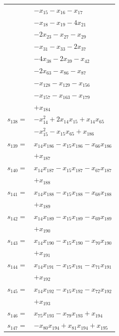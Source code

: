\begin{longtable}{@{}r@{\;}l@{}}
 & \(\displaystyle -x_{15} -x_{16} -x_{17}\) \\
 & \(\displaystyle -x_{18} -x_{19} -4x_{21}\) \\
 & \(\displaystyle -2x_{23} -x_{27} -x_{29}\) \\
 & \(\displaystyle -x_{31} -x_{33} -2x_{37}\) \\
 & \(\displaystyle -4x_{38} -2x_{39} -x_{42}\) \\
 & \(\displaystyle -2x_{63} -x_{86} -x_{87}\) \\
 & \(\displaystyle -x_{128} -x_{129} -x_{156}\) \\
 & \(\displaystyle -x_{157} -x_{163} -x_{179}\) \\
 & \(\displaystyle +x_{184}\) \\[3pt]
\(s_{138}=\) & \(\displaystyle -x_{14}^{2} +2x_{14}x_{15} +x_{14}x_{65}\) \\
 & \(\displaystyle -x_{15}^{2} -x_{15}x_{65} +x_{186}\) \\[3pt]
\(s_{139}=\) & \(\displaystyle x_{14}x_{186} -x_{15}x_{186} -x_{66}x_{186}\) \\
 & \(\displaystyle +x_{187}\) \\[3pt]
\(s_{140}=\) & \(\displaystyle x_{14}x_{187} -x_{15}x_{187} -x_{67}x_{187}\) \\
 & \(\displaystyle +x_{188}\) \\[3pt]
\(s_{141}=\) & \(\displaystyle x_{14}x_{188} -x_{15}x_{188} -x_{68}x_{188}\) \\
 & \(\displaystyle +x_{189}\) \\[3pt]
\(s_{142}=\) & \(\displaystyle x_{14}x_{189} -x_{15}x_{189} -x_{69}x_{189}\) \\
 & \(\displaystyle +x_{190}\) \\[3pt]
\(s_{143}=\) & \(\displaystyle x_{14}x_{190} -x_{15}x_{190} -x_{70}x_{190}\) \\
 & \(\displaystyle +x_{191}\) \\[3pt]
\(s_{144}=\) & \(\displaystyle x_{14}x_{191} -x_{15}x_{191} -x_{71}x_{191}\) \\
 & \(\displaystyle +x_{192}\) \\[3pt]
\(s_{145}=\) & \(\displaystyle x_{14}x_{192} -x_{15}x_{192} -x_{72}x_{192}\) \\
 & \(\displaystyle +x_{193}\) \\[3pt]
\(s_{146}=\) & \(\displaystyle x_{75}x_{193} -x_{79}x_{193} +x_{194}\) \\[3pt]
\(s_{147}=\) & \(\displaystyle -x_{80}x_{194} +x_{81}x_{194} +x_{195}\) \\[3pt]

\end{longtable}
